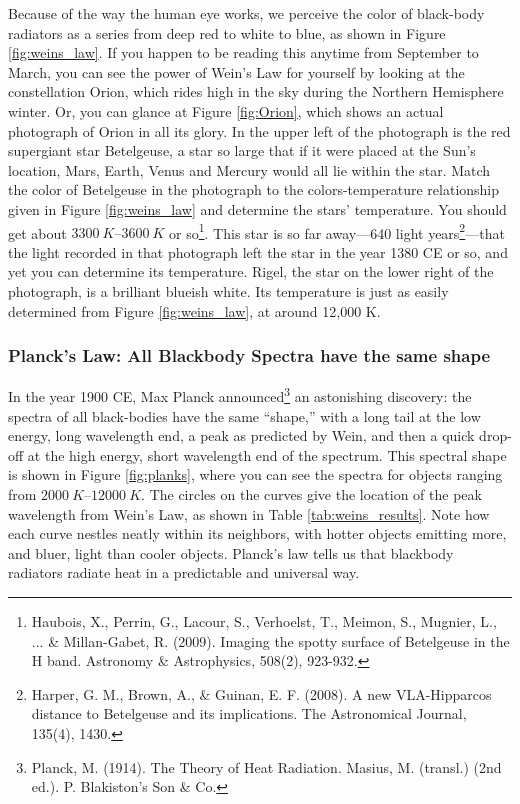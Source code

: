 Because of the way the human eye works, we perceive the color of black-body radiators as a series from deep red to white to blue, as shown in Figure \ref{fig:weins_law}. If you happen to be reading this anytime from September to March, you can see the power of Wein's Law for yourself by looking at the constellation Orion, which rides high in the sky during the Northern Hemisphere winter. Or, you can glance at Figure \ref{fig:Orion}, which shows an actual photograph of Orion in all its glory. In the upper left of the photograph is the red supergiant star Betelgeuse, a star so large that if it were placed at the Sun's location, Mars, Earth, Venus and Mercury would all lie within the star. Match the color of Betelgeuse in the photograph to the colors-temperature relationship given in Figure \ref{fig:weins_law} and determine the stars' temperature. You should get about $\SIrange{3300}{3600}{K}$ or so\footnote{Haubois, X., Perrin, G., Lacour, S., Verhoelst, T., Meimon, S., Mugnier, L., ... \& Millan-Gabet, R. (2009). Imaging the spotty surface of Betelgeuse in the H band. Astronomy \& Astrophysics, 508(2), 923-932.}. This star is so far away---640 light years\footnote{Harper, G. M., Brown, A., \& Guinan, E. F. (2008). A new VLA-Hipparcos distance to Betelgeuse and its implications. The Astronomical Journal, 135(4), 1430. }---that the light recorded in that photograph left the star in the year 1380 CE or so, and yet you can determine its temperature. Rigel, the star on the lower right of the photograph, is a brilliant blueish white. Its temperature is just as easily determined from Figure \ref{fig:weins_law}, at around 12,000 K. 

\subsubsection{Planck's Law: All Blackbody Spectra have the same shape}
In the year 1900 CE, Max Planck announced\footnote{Planck, M. (1914). The Theory of Heat Radiation. Masius, M. (transl.) (2nd ed.). P. Blakiston's Son \& Co.} an astonishing discovery: the spectra of all black-bodies have the same ``shape,'' with a long tail at the low energy, long wavelength end, a peak as predicted by Wein, and then a quick drop-off at the high energy, short wavelength end of the spectrum. This spectral shape is shown in Figure \ref{fig:planks}, where you can see the spectra for objects ranging from $\SIrange{2000}{12000}{K}$. The circles on the curves give the location of the peak wavelength from Wein's Law, as shown in Table \ref{tab:weins_results}. Note how each curve nestles neatly within its neighbors, with hotter objects emitting more, and bluer, light than cooler objects. Planck's law tells us that blackbody radiators radiate heat in a predictable and universal way. 
